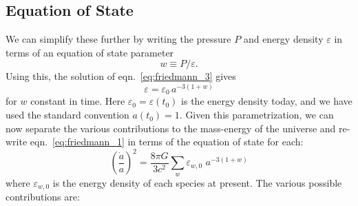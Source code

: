 \subsection{Equation of State}
We can simplify these further by writing the pressure $P$ and energy
density $\varepsilon$ in terms of an equation of state parameter
\begin{equation}
  \label{eq:w_EOS}
  w \equiv P / \varepsilon.
\end{equation}
Using this, the solution of eqn.~\ref{eq:friedmann_3} gives
\begin{equation}
  \label{eq:w_constant}
  \varepsilon = \varepsilon_0\, a^{-3(1 + w)}
\end{equation}
for $w$ constant in time.
Here $\varepsilon_0 = \varepsilon(t_0)$ is the energy density today,
and we have used the standard convention $a(t_0) = 1$.
Given this parametrization, we can now
separate the various contributions to the mass-energy of the universe
and re-write eqn.~\ref{eq:friedmann_1} in terms of the equation of
state for each:
\begin{equation}
  \label{eq:friedmann_1_split}
  \left(\frac{\dot{a}}{a}\right)^2 = \frac{8\pi G}{3c^2}
  \sum_w \varepsilon_{w, 0} \,\, a^{-3(1 + w)}
\end{equation}
where $\varepsilon_{w,0}$ is the energy density of each species at present.
The various possible contributions are:
